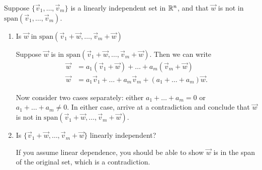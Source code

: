 \documentclass{ximera}
\begin{document}
\begin{problem}\label{prob:Anna3.1}
    Suppose $\{\vec{v}_{1}, \dots , \vec{v}_{m}\}$ is a linearly independent set in $\mathbb{R}^n$, and that $\vec{w}$ is not in $\mbox{span}\left(\vec{v}_{1}, \dots , \vec{v}_{m}\right)$.

    \begin{enumerate}
        \item Is $\vec{w}$ in $\mbox{span}\left(\vec{v}_{1}+\vec{w}, \dots , \vec{v}_{m}+\vec{w}\right)$

                \begin{hint}
            Suppose $\vec{w}$ is in $\mbox{span}\left(\vec{v}_{1}+\vec{w}, \dots , \vec{v}_{m}+\vec{w}\right)$.  Then we can write
\begin{align*}
    \vec{w} &= a_1 (\vec{v}_{1}+\vec{w}) + \dots + a_m (\vec{v}_{m}+\vec{w}) \\
    \vec{w} &= a_1\vec{v}_{1} + \dots + a_m\vec{v}_{m}+ (a_1 + \dots + a_m)\vec{w}.
    \end{align*}

Now consider two cases separately: either $a_1 + \dots + a_m = 0$ or $a_1 + \dots + a_m \ne 0$.  In either case, arrive at a contradiction and conclude that $\vec{w}$ is not in $\mbox{span}\left(\vec{v}_{1}+\vec{w}, \dots , \vec{v}_{m}+\vec{w}\right)$.
        \end{hint}

\item Is $\{\vec{v}_{1}+\vec{w}, \dots , \vec{v}_{m}+\vec{w}\}$ linearly independent?


\begin{hint}
            If you assume linear dependence, you should be able to show $\vec{w}$ is in the span of the original set, which is a contradiction.
\end{hint}

    \end{enumerate}
\end{problem}
\end{document}
